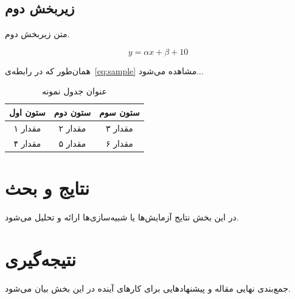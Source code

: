 \documentclass[journal]{IEEEtran}
\begin{document}
	\subsection{زیربخش دوم}
	متن زیربخش دوم.
	
	\begin{equation}
		y = \alpha x + \beta + 10
		\label{eq:sample}
	\end{equation}
	
	همان‌طور که در رابطه‌ی~\eqref{eq:sample} مشاهده می‌شود...
	
	\begin{table}[!t]
		\caption{عنوان جدول نمونه}
		\label{tab:sample}
		\centering
		\begin{tabular}{ccc}
			\toprule
			ستون اول & ستون دوم & ستون سوم \\
			\midrule
			مقدار ۱ & مقدار ۲ & مقدار ۳ \\
			مقدار ۴ & مقدار ۵ & مقدار ۶ \\
			\bottomrule
		\end{tabular}
	\end{table}
	
	
	\section{نتایج و بحث}
	در این بخش نتایج آزمایش‌ها یا شبیه‌سازی‌ها ارائه و تحلیل می‌شود.
	
	\section{نتیجه‌گیری}
	جمع‌بندی نهایی مقاله و پیشنهادهایی برای کارهای آینده در این بخش بیان می‌شود.
	
	\nocite{*}
	\setLTRbibitems
	
	
\end{document}
